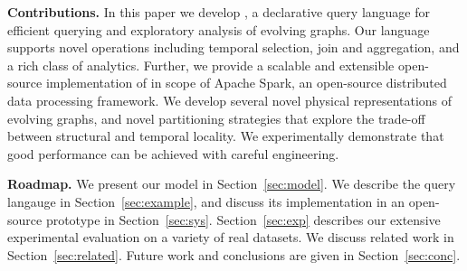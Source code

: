 {\bf Contributions.} In this paper we develop \ql, a declarative query
language for efficient querying and exploratory analysis of evolving
graphs. Our language supports novel operations including temporal
selection, join and aggregation, and a rich class of analytics.
Further, we provide a scalable and extensible open-source
implementation of \ql in scope of Apache Spark, an open-source
distributed data processing framework.  We develop several novel
physical representations of evolving graphs, and novel partitioning
strategies that explore the trade-off between structural and temporal
locality.  We experimentally demonstrate that good performance can be
achieved with careful engineering.

{\bf Roadmap.}  We present our model in Section~\ref{sec:model}.  We
describe the \ql query langauge in Section~\ref{sec:example}, and
discuss its implementation in an open-source prototype in
Section~\ref{sec:sys}.  Section~\ref{sec:exp} describes our extensive
experimental evaluation on a variety of real datasets.  We discuss
related work in Section~\ref{sec:related}.  Future work and
conclusions are given in Section~\ref{sec:conc}.
